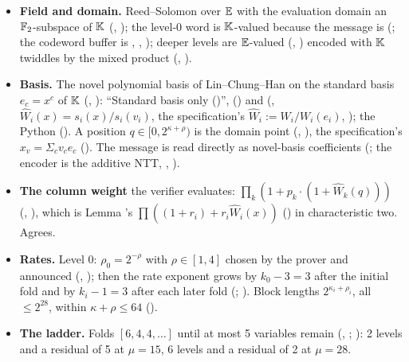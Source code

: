 \begin{sloppypar}
\begin{itemize}
\item \textbf{Field and domain.} Reed--Solomon over $\mathbb{E}$ with the evaluation domain an
  $\mathbb{F}_2$-subspace of $\mathbb{K}$ (, ); the level-0 word is $\mathbb{K}$-valued because the
  message is (; the codeword buffer is , ,
  ); deeper levels are $\mathbb{E}$-valued (, ) encoded with $\mathbb{K}$
  twiddles by the mixed product (, ).
\item \textbf{Basis.} The novel polynomial basis of Lin--Chung--Han on the standard basis
  $e_c = x^c$ of $\mathbb{K}$ (, ):  ``Standard basis
  only ()'',  () and
   (, $\hat{W}_i(x) = s_i(x)/s_i(v_i)$, the specification's
  $\hat{W}_i := W_i/W_i(e_i)$, ); the Python  ().
  A position $q ∈ [0, 2^{κ+ρ})$ is the domain point  (,
  ), the specification's $x_v = Σ_c v_c e_c$ (). The message is read
  directly as novel-basis coefficients (; the encoder is the additive NTT,
  , ).
\item \textbf{The column weight} the verifier evaluates: $∏_k (1 + p_k·(1 + \hat{W}_k(q)))$
  (, ), which is Lemma 's
  $∏((1 + r_i) + r_i \hat{W}_i(x))$ () in characteristic two. Agrees.
\item \textbf{Rates.} Level 0: $ρ_0 = 2^{−ρ}$ with $ρ ∈ [1, 4]$ chosen by the prover and announced
  (, ); then the rate exponent grows by
  $k_0 − 3 = 3$ after the initial fold and by $k_i − 1 = 3$ after each later fold
  (; ). Block lengths $2^{κ_i + ρ_i}$, all
  $≤ 2^{28}$, within $κ + ρ ≤ 64$ ().
\item \textbf{The ladder.} Folds $[6, 4, 4, …]$ until at most 5 variables remain
  (, ; ): 2 levels and a residual
  of 5 at $μ = 15$, 6 levels and a residual of 2 at $μ = 28$.
\end{itemize}
\end{sloppypar}

